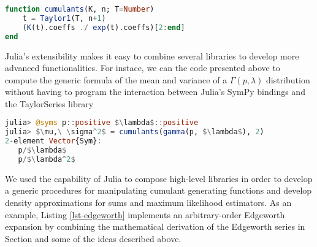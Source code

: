 \begin{lstlisting}[language=Julia, mathescape, escapechar=\%, basicstyle=\small]
function cumulants(K, n; T=Number)
    t = Taylor1(T, n+1)
    (K(t).coeffs ./ exp(t).coeffs)[2:end]
end
\end{lstlisting}
Julia's extensibility makes it easy to combine several libraries to develop more advanced functionalities. For instace, we can the code presented above to compute the generic formula of the mean and variance of a $\Gamma(p, \lambda)$ distribution without having to program the interaction between Julia's SymPy bindings and the TaylorSeries library
\begin{lstlisting}[language=Julia, mathescape, escapechar=\%]
julia> @syms p::positive $\lambda$::positive
julia> $\mu,\ \sigma^2$ = cumulants(gamma(p, $\lambda$), 2)
2-element Vector{Sym}:
   p/$\lambda$
   p/$\lambda^2$
\end{lstlisting}
We used the capability of Julia to compose high-level libraries in order to develop a generic procedures for manipulating cumulant generating functions and develop density approximations for sums and maximum likelihood estimators. As an example, Listing \ref{lst-edgeworth} implements an arbitrary-order Edgeworth expansion by combining the mathematical derivation of the Edgeworth series in Section  and some of the ideas described above.

